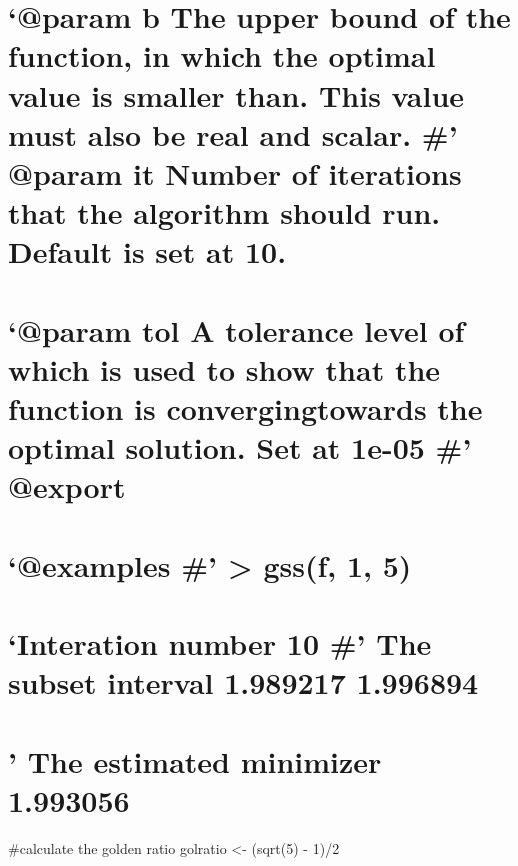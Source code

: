 \documentclass[]{article}
\begin{document}
\section{\texorpdfstring{`@param b The upper bound of the function, in
which the optimal value is smaller than. This value must also be real
and scalar. \#' @param it Number of iterations that the algorithm should
run. Default is set at
10.}{@param b The upper bound of the function, in which the optimal value is smaller than. This value must also be real and scalar. \# @param it Number of iterations that the algorithm should run. Default is set at 10.}}\label{param-b-the-upper-bound-of-the-function-in-which-the-optimal-value-is-smaller-than.-this-value-must-also-be-real-and-scalar.-param-it-number-of-iterations-that-the-algorithm-should-run.-default-is-set-at-10.}

\section{\texorpdfstring{`@param tol A tolerance level of which is used
to show that the function is convergingtowards the optimal solution. Set
at 1e-05 \#'
@export}{@param tol A tolerance level of which is used to show that the function is convergingtowards the optimal solution. Set at 1e-05 \# @export}}\label{param-tol-a-tolerance-level-of-which-is-used-to-show-that-the-function-is-convergingtowards-the-optimal-solution.-set-at-1e-05-export}

\section{\texorpdfstring{`@examples \#' \textgreater{} gss(f, 1,
5)}{@examples \# \textgreater{} gss(f, 1, 5)}}\label{examples-gssf-1-5}

\section{\texorpdfstring{`Interation number 10 \#' The subset interval
1.989217
1.996894}{Interation number 10 \# The subset interval 1.989217 1.996894}}\label{interation-number-10-the-subset-interval-1.989217-1.996894}

\section{' The estimated minimizer
1.993056}\label{the-estimated-minimizer-1.993056}

\#calculate the golden ratio golratio \textless{}- (sqrt(5) - 1)/2
\end{document}
